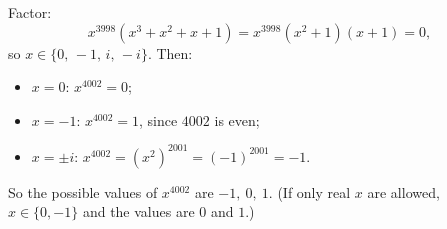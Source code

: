 Factor:
\[x^{3998}\left(x^3+x^2+x+1\right)=x^{3998}\left(x^2+1\right)(x+1)=0 ,\]
so $x\in\{0,\,-1,\,i,\,-i\}$. Then:
\begin{itemize}
\item $x=0$: $x^{4002}=0$;
\item $x=-1$: $x^{4002}=1$, since $4002$ is even;
\item $x=\pm i$: $x^{4002}=\left(x^2\right)^{2001}=(-1)^{2001}=-1$.
\end{itemize}
So the possible values of $x^{4002}$ are $\boxed{-1,\ 0,\ 1}$. (If only real $x$ are allowed, $x\in\{0,-1\}$ and the values are $0$ and $1$.)
